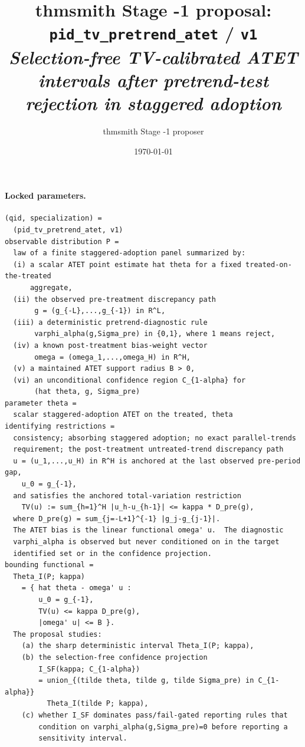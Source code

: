 \documentclass[11pt]{article}
\title{thmsmith Stage -1 proposal: \texttt{pid\_tv\_pretrend\_atet} / \texttt{v1}%
  \\ \large\textit{Selection-free TV-calibrated ATET intervals after pretrend-test rejection in staggered adoption}}
\author{thmsmith Stage -1 proposer}
\date{\today}
\theoremstyle{definition}
\theoremstyle{plain}
\theoremstyle{remark}
\begin{document}
\maketitle


\paragraph{Locked parameters.}
\begin{verbatim}
(qid, specialization) =
  (pid_tv_pretrend_atet, v1)
observable distribution P =
  law of a finite staggered-adoption panel summarized by:
  (i) a scalar ATET point estimate hat theta for a fixed treated-on-the-treated
      aggregate,
  (ii) the observed pre-treatment discrepancy path
       g = (g_{-L},...,g_{-1}) in R^L,
  (iii) a deterministic pretrend-diagnostic rule
       varphi_alpha(g,Sigma_pre) in {0,1}, where 1 means reject,
  (iv) a known post-treatment bias-weight vector
       omega = (omega_1,...,omega_H) in R^H,
  (v) a maintained ATET support radius B > 0,
  (vi) an unconditional confidence region C_{1-alpha} for
       (hat theta, g, Sigma_pre)
parameter theta =
  scalar staggered-adoption ATET on the treated, theta
identifying restrictions =
  consistency; absorbing staggered adoption; no exact parallel-trends
  requirement; the post-treatment untreated-trend discrepancy path
  u = (u_1,...,u_H) in R^H is anchored at the last observed pre-period gap,
    u_0 = g_{-1},
  and satisfies the anchored total-variation restriction
    TV(u) := sum_{h=1}^H |u_h-u_{h-1}| <= kappa * D_pre(g),
  where D_pre(g) = sum_{j=-L+1}^{-1} |g_j-g_{j-1}|.
  The ATET bias is the linear functional omega' u.  The diagnostic
  varphi_alpha is observed but never conditioned on in the target
  identified set or in the confidence projection.
bounding functional =
  Theta_I(P; kappa)
    = { hat theta - omega' u :
        u_0 = g_{-1},
        TV(u) <= kappa D_pre(g),
        |omega' u| <= B }.
  The proposal studies:
    (a) the sharp deterministic interval Theta_I(P; kappa),
    (b) the selection-free confidence projection
        I_SF(kappa; C_{1-alpha})
        = union_{(tilde theta, tilde g, tilde Sigma_pre) in C_{1-alpha}}
          Theta_I(tilde P; kappa),
    (c) whether I_SF dominates pass/fail-gated reporting rules that
        condition on varphi_alpha(g,Sigma_pre)=0 before reporting a
        sensitivity interval.
\end{verbatim}
\end{document}
